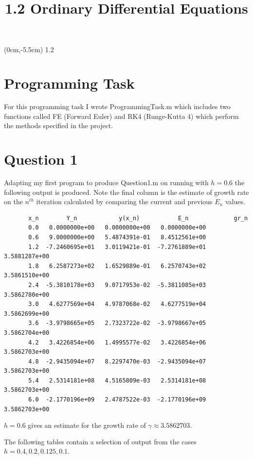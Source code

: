 \documentclass[a4paper]{article}
\title{\vspace*{2cm}1.2 Ordinary Differential Equations\vspace*{-1.5cm}}
\date{}
\begin{document}
\maketitle

\begin{textblock*}{100mm}(0cm,-5.5cm)
\Huge 1.2
\end{textblock*}

\section*{Programming Task}
For this programming task I wrote Programming\textunderscore Task.m which includes two functions called FE (Forward Euler) and RK4 (Runge-Kutta 4) which perform the methods specified in the project.

\section*{Question 1}
Adapting my first program to produce Question\textunderscore1.m on running with $h=0.6$ the following output is produced. Note the final column is the estimate of growth rate on the $n^{th}$ iteration calculated by comparing the current and previous $E_n$ values.
\begin{table}[H]
\centering
\begin{verbatim}
       x_n        Y_n            y(x_n)           E_n             gr_n 
       0.0   0.0000000e+00   0.0000000e+00   0.0000000e+00 
       0.6   9.0000000e+00   5.4874391e-01   8.4512561e+00 
       1.2  -7.2460695e+01   3.0119421e-01  -7.2761889e+01   3.5881287e+00 
       1.8   6.2587273e+02   1.6529889e-01   6.2570743e+02   3.5861510e+00 
       2.4  -5.3810178e+03   9.0717953e-02  -5.3811085e+03   3.5862780e+00 
       3.0   4.6277569e+04   4.9787068e-02   4.6277519e+04   3.5862699e+00 
       3.6  -3.9798665e+05   2.7323722e-02  -3.9798667e+05   3.5862704e+00 
       4.2   3.4226854e+06   1.4995577e-02   3.4226854e+06   3.5862703e+00 
       4.8  -2.9435094e+07   8.2297470e-03  -2.9435094e+07   3.5862703e+00 
       5.4   2.5314181e+08   4.5165809e-03   2.5314181e+08   3.5862703e+00 
       6.0  -2.1770196e+09   2.4787522e-03  -2.1770196e+09   3.5862703e+00
\end{verbatim}
\caption{$h=0.6$ gives an estimate for the growth rate of $\gamma \approx 3.5862703$.}
\end{table}

The following tables contain a selection of output from the cases $h=0.4,0.2,0.125,0.1$. \\
\end{document}
